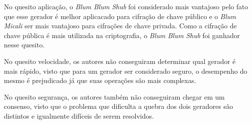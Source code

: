 No quesito aplicação, o \textit{Blum Blum Shub} foi considerado mais vantajoso pelo fato que esse gerador é melhor aplicacado para cifração de chave público e o \textit{Blum Micali} ser mais vantajoso para cifrações de chave privada. Como a cifração de chave pública é mais utilizada na criptografia, o \textit{Blum Blum Shub} foi ganhador nesse quesito.

No quesito velocidade, os autores não conseguiram determinar qual gerador é mais rápido, visto que para um gerador ser considerado seguro, o desempenho do mesmo é prejudicado já que suas operações são mais complexas.

No quesito segurança, os autores também não conseguiram chegar em um consenso, visto que o problema que dificulta a quebra dos dois geradores são distintos e igualmente difíceis de serem resolvidos.